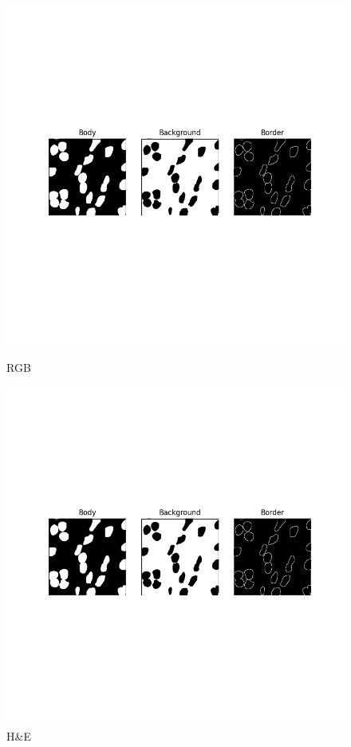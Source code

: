 \documentclass[target=bach,aauheader=,style=]{thud}
\begin{document}
\begin{figure}[ht]
\centering

\begin{minipage}{0.45\textwidth}
    \centering
    \includegraphics[width=\linewidth]{imgs/3ch_binarymask.png}
    \caption*{RGB} %
\end{minipage}
\hspace{0.5cm}
\begin{minipage}{0.45\textwidth}
    \centering
    \includegraphics[width=\linewidth]{imgs/3ch_binarymask.png}
    \caption*{H\&E}
\end{minipage}


\end{figure}
\end{document}
